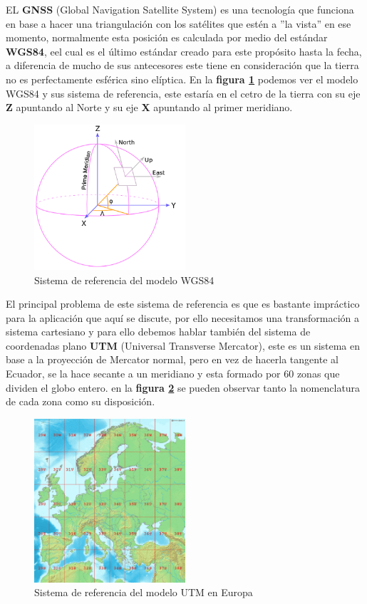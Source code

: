 EL \textbf{GNSS} (Global Navigation Satellite System) es una tecnología que funciona en base a hacer una triangulación con los satélites que 
estén a ''la vista'' en ese momento, normalmente esta 
posición es calculada por medio del estándar \textbf{WGS84}, eel cual es el último estándar creado para este propósito hasta la fecha, a 
diferencia de mucho de sus antecesores este tiene en consideración 
que la tierra no es perfectamente esférica sino elíptica. En la \textbf{figura \ref{fig:wgs84}} podemos ver el modelo WGS84 y sus sistema 
de referencia, este estaría en el cetro de la tierra 
con su eje \textbf{Z} apuntando al Norte y su eje \textbf{X} apuntando al primer meridiano.

\begin{figure}[h]
    \centering
    \includegraphics[width=0.5\textwidth]{images/wgs84.png}
    \caption{Sistema de referencia del modelo WGS84}
    \label{fig:wgs84}
\end{figure}

El principal problema de este sistema de referencia es que es bastante impráctico para la aplicación que aquí se discute, por ello 
necesitamos una transformación a sistema cartesiano y para ello debemos hablar también del sistema de coordenadas plano \textbf{UTM} 
(Universal Transverse Mercator), este es un sistema en base a la proyección de Mercator normal, pero en vez de hacerla tangente al Ecuador, 
se la hace secante a un meridiano y esta formado por 60 zonas que dividen el globo entero.  en la \textbf{figura \ref{fig:utm_europa}} se 
pueden observar tanto la nomenclatura de cada zona como su disposición.

\begin{figure}[h]
    \centering
    \includegraphics[width=0.5\textwidth]{images/europe_utm.png}
    \caption{Sistema de referencia del modelo UTM en Europa}
    \label{fig:utm_europa}
\end{figure}


